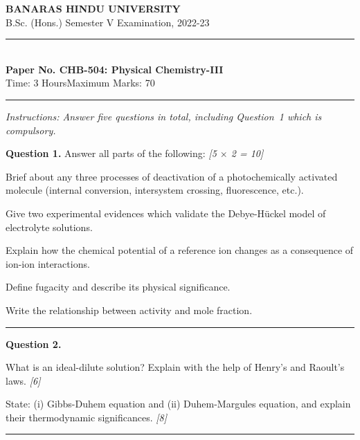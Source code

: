 \documentclass[11pt,a4paper]{article}
\newcommand{\pts}[1]{\hfill   \textit{[#1]}}
\begin{document}
\begin{center}
  {\large\bfseries BANARAS HINDU UNIVERSITY}\\[2pt]
  {\normalsize B.Sc. (Hons.) Semester V Examination, 2022-23}\\[6pt]
  \rule{0.8\linewidth}{0.5pt}\\[6pt]
  {\large\bfseries Paper No. CHB-504: Physical Chemistry-III}\\[4pt]
  {\normalsize Time: 3 Hours\hfill Maximum Marks: 70}
\end{center}
\rule{\linewidth}{0.4pt}
\small



\noindent   \textit{Instructions: Answer five questions in total, including Question~1 which is compulsory.}

\normalsize
\bigskip




\noindent   \textbf{Question 1.} Answer all parts of the following: \pts{5 $ \times$ 2 = 10}

\begin{parts}
  \item Brief about any three processes of deactivation of a photochemically activated molecule (internal conversion, intersystem crossing, fluorescence, etc.).
  \item Give two experimental evidences which validate the Debye-H\"uckel model of electrolyte solutions.
  \item Explain how the chemical potential of a reference ion changes as a consequence of ion-ion interactions.
  \item Define fugacity and describe its physical significance.
  \item Write the relationship between activity and mole fraction.
\end{parts}

\medskip\rule{\linewidth}{0.2pt}




\noindent   \textbf{Question 2.}

\begin{parts}
  \item What is an ideal-dilute solution? Explain with the help of Henry's and Raoult's laws. \pts{6}
  \item State: (i) Gibbs-Duhem equation and (ii) Duhem-Margules equation, and explain their thermodynamic significances. \pts{8}
\end{parts}

\medskip\rule{\linewidth}{0.2pt}
\end{document}

